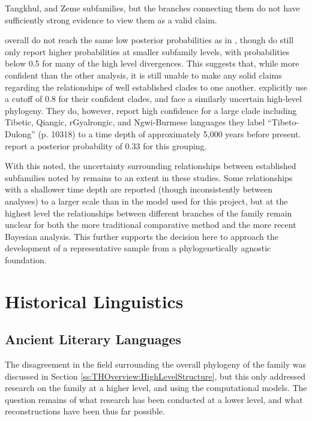 Tangkhul, and Zeme subfamilies, but the branches connecting them do not have sufficiently strong evidence to view them as a valid claim.

 overall do not reach the same low posterior probabilities as in , though do still only report higher probabilities at smaller subfamily levels, with probabilities below 0.5 for many of the high level divergences. This suggests that, while more confident than the other analysis, it is still unable to make any solid claims regarding the relationships of well established clades to one another.  explicitly use a cutoff of 0.8 for their confident clades, and face a similarly uncertain high-level phylogeny. They do, however, report high confidence for a large clade including Tibetic, Qiangic, rGyalrongic, and Ngwi-Burmese languages they label ``Tibeto-Dulong'' (p. 10318) to a time depth of approximately 5,000 years before present.  report a posterior probability of 0.33 for this grouping.

With this noted, the uncertainty surrounding relationships between established subfamilies noted by  remains to an extent in these studies. Some relationships with a shallower time depth are reported (though inconsistently between analyses) to a larger scale than in the model used for this project, but at the highest level the relationships between different branches of the family remain unclear for both the more traditional comparative method and the more recent Bayesian analysis. This further supports the decision here to approach the development of a representative sample from a phylogenetically agnostic foundation.


\section{Historical Linguistics}
\subsection{Ancient Literary Languages}\label{s:AncientLiteraryLanguages}
The disagreement in the field surrounding the overall phylogeny of the family was discussed in Section \ref{ss:THOverview:HighLevelStructure}, but this only addressed research on the family at a higher level, and using the computational models. The question remains of what research has been conducted at a lower level, and what reconstructions have been thus far possible.

